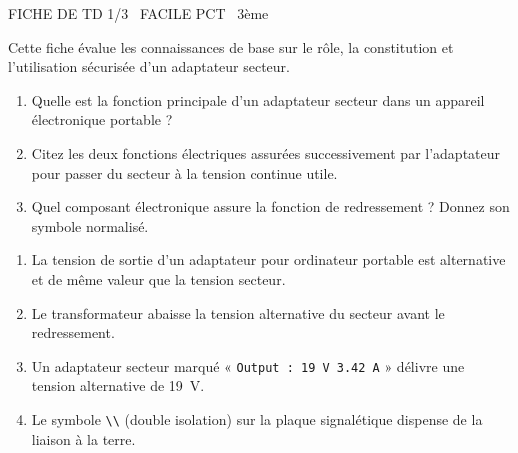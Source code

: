 \documentclass[11pt]{article}
\begin{document}
\begin{tcolorbox}[enhanced,colback=popink,colframe=popink,arc=10pt,boxrule=0pt,left=12pt,right=12pt,top=9pt,bottom=9pt]
{\color{white}\popxbold\small FICHE DE TD 1/3 \textbullet\ FACILE \hfill PCT \textbullet\ 3ème\par}
\end{tcolorbox}
\vspace{4pt}
Cette fiche évalue les connaissances de base sur le rôle, la constitution et l'utilisation sécurisée d'un adaptateur secteur.

\begin{exercice}
\begin{enumerate}
    \item Quelle est la fonction principale d'un adaptateur secteur dans un appareil électronique portable ?
    \item Citez les deux fonctions électriques assurées successivement par l'adaptateur pour passer du secteur à la tension continue utile.
    \item Quel composant électronique assure la fonction de redressement ? Donnez son symbole normalisé.
\end{enumerate}
\end{exercice}

\begin{exercice}
\begin{enumerate}
    \item La tension de sortie d'un adaptateur pour ordinateur portable est alternative et de même valeur que la tension secteur.
    \item Le transformateur abaisse la tension alternative du secteur avant le redressement.
    \item Un adaptateur secteur marqué « \texttt{Output : \SI{19}{V} \text{---} \SI{3.42}{A}} » délivre une tension alternative de \SI{19}{V}.
    \item Le symbole \texttt{\textbackslash\textbackslash} (double isolation) sur la plaque signalétique dispense de la liaison à la terre.
\end{enumerate}
\end{exercice}
\end{document}
